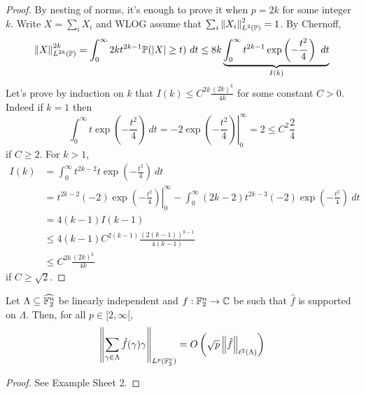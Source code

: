 \documentclass{article}
\begin{document}
\begin{proof}
  By nesting of norms, it's enough to prove it when $p = 2k$ for some integer $k$. Write $X = \sum_i X_i$ and WLOG assume that $\sum_i \left\lVert X_i\right\rVert_{L^2(\mathbb P)}^2 = 1$. By Chernoff,
  $$\left\lVert X\right\rVert_{L^{2k}(\mathbb P)}^{2k} = \int_0^\infty 2k t^{2k - 1} \mathbb P(\left\lvert X\right\rvert \ge t)\ dt \le 8k \underbrace{\int_0^\infty t^{2k - 1} \exp\left(-\frac{t^2}4\right)\ dt}_{I(k)}$$
  Let's prove by induction on $k$ that $I(k) \le C^{2k}\frac{(2k)^k}{4k}$ for some constant $C > 0$. Indeed if $k = 1$ then
  $$\int_0^\infty t \exp\left(-\frac{t^2}4\right)\ dt = \left. -2\exp\left(-\frac{t^2}4\right)\right|_0^\infty = 2 \le C^2 \frac 24$$
  if $C \ge 2$. For $k > 1$,
  \begin{align*}
    I(k)
    & = \int_0^\infty t^{2k - 2} t \exp\left(-\frac{t^2}4\right)\ dt \\
    & = \left. t^{2k - 2} (-2)\exp\left(-\frac{t^2}4\right)\right|_0^\infty - \int_0^\infty (2k - 2)t^{2k - 3}(-2)\exp\left(-\frac{t^2}4\right)\ dt \\
    & = 4(k - 1)I(k - 1) \\
    & \le 4(k - 1)C^{2(k - 1)}\frac{(2(k - 1))^{k - 1}}{4(k - 1)} \\
    & \le C^{2k}\frac{(2k)^k}{4k}
  \end{align*}
  if $C \ge \sqrt 2$.
\end{proof}

\begin{ncor}
  Let $\Lambda \subseteq \widehat{\mathbb F_2^n}$ be linearly independent and $f : \mathbb F_2^n \to \mathbb C$ be such that $\hat f$ is supported on $\Lambda$. Then, for all $p \in [2, \infty[$,
  $$\left\lVert \sum_{\gamma \in \Lambda} \hat f(\gamma)\gamma\right\rVert_{L^p(\mathbb F_2^n)} = O\left(\sqrt p \left\lVert \hat f\right\rVert_{\ell^2(\Lambda)}\right)$$
\end{ncor}
\begin{proof}
  See Example Sheet 2.
\end{proof}
\end{document}
